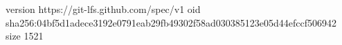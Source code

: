 version https://git-lfs.github.com/spec/v1
oid sha256:04bf5d1adece3192e0791eab29fb49302f58ad030385123e05d44efccf506942
size 1521
